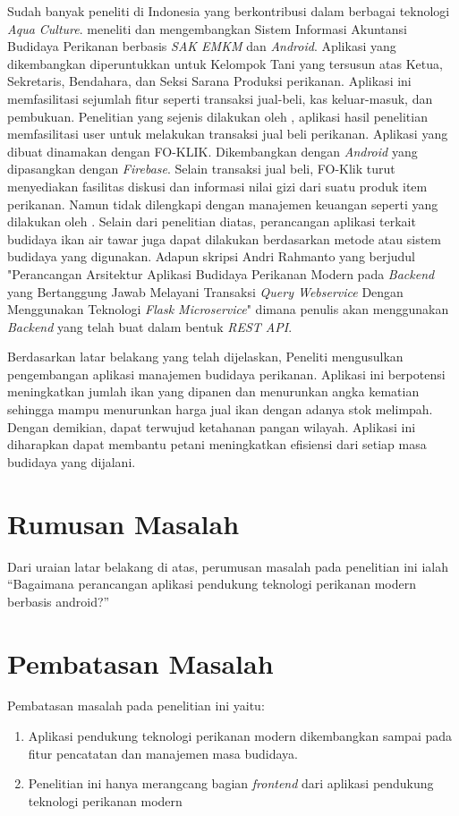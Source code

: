 Sudah banyak peneliti di Indonesia  yang berkontribusi dalam berbagai teknologi \textit{Aqua Culture}. \citep{supriati2018} meneliti dan mengembangkan Sistem Informasi Akuntansi Budidaya Perikanan berbasis \textit{SAK EMKM} dan \textit{Android}. Aplikasi yang dikembangkan diperuntukkan untuk Kelompok Tani yang tersusun atas Ketua, Sekretaris, Bendahara, dan Seksi Sarana Produksi perikanan. Aplikasi ini memfasilitasi sejumlah fitur seperti transaksi jual-beli, kas keluar-masuk, dan pembukuan. Penelitian yang sejenis dilakukan oleh \citep{widhiastika2021}, aplikasi hasil penelitian memfasilitasi user untuk melakukan transaksi jual beli perikanan. Aplikasi yang dibuat dinamakan dengan FO-KLIK. Dikembangkan dengan \textit{Android} yang dipasangkan dengan \textit{Firebase}. Selain transaksi jual beli, FO-Klik turut menyediakan fasilitas diskusi dan informasi nilai gizi dari suatu produk item perikanan. Namun tidak dilengkapi dengan manajemen keuangan seperti yang dilakukan oleh \citep{supriati2018}. Selain dari penelitian diatas, perancangan aplikasi terkait budidaya ikan air tawar juga dapat dilakukan berdasarkan metode atau sistem budidaya yang digunakan. Adapun skripsi Andri Rahmanto yang berjudul "Perancangan Arsitektur Aplikasi Budidaya Perikanan Modern pada \textit{Backend} yang Bertanggung Jawab Melayani Transaksi \textit{Query Webservice} Dengan Menggunakan Teknologi \textit{Flask Microservice}" dimana penulis akan menggunakan \textit{Backend} yang telah buat dalam bentuk \textit{REST API}.

Berdasarkan latar belakang yang telah dijelaskan, Peneliti mengusulkan pengembangan aplikasi manajemen budidaya perikanan. Aplikasi ini berpotensi meningkatkan jumlah ikan yang dipanen dan menurunkan angka kematian sehingga mampu menurunkan harga jual ikan dengan adanya stok melimpah. Dengan demikian, dapat terwujud ketahanan pangan wilayah. Aplikasi ini diharapkan dapat membantu petani meningkatkan efisiensi dari setiap masa budidaya yang dijalani.

\section{Rumusan Masalah}
Dari uraian latar belakang di atas, perumusan masalah pada penelitian ini ialah “Bagaimana perancangan aplikasi pendukung teknologi perikanan modern berbasis android?”

\section{Pembatasan Masalah}
Pembatasan masalah pada penelitian ini yaitu:
\begin{enumerate}
	\item Aplikasi pendukung teknologi perikanan modern dikembangkan sampai pada fitur pencatatan dan manajemen masa budidaya.
		
	\item Penelitian ini hanya merangcang bagian \textit{frontend} dari aplikasi pendukung teknologi perikanan modern	 			
\end{enumerate}

